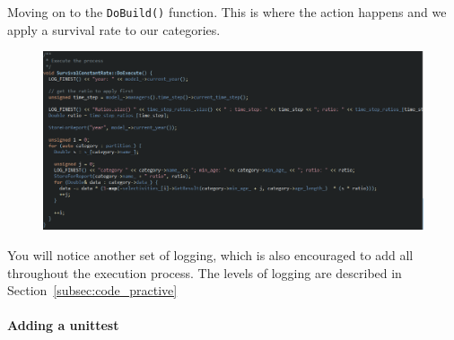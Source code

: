 Moving on to the \texttt{DoBuild()} function. This is where the action happens and we apply a survival rate to our categories.
\clearpage
\begin{figure}[!ht]
	\centering
	\includegraphics[scale=0.65]{Figures/execute.png}
	\caption{}\label{fig:execute}
\end{figure}

You will notice another set of logging, which is also encouraged to add all throughout the execution process. The levels of logging are described in Section~\ref{subsec:code_practive}

\paragraph*{Adding a unittest}

